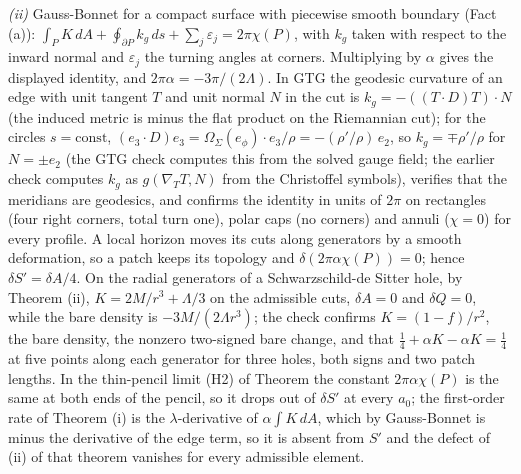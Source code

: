 \emph{(ii)} Gauss-Bonnet for a compact surface with piecewise smooth boundary (Fact (a)): $\int_{P}K\,dA + \oint_{\partial P}k_{g}\,ds + \sum_{j}\varepsilon_{j} = 2\pi\chi(P)$, with $k_{g}$ taken with respect to the inward normal and $\varepsilon_{j}$ the turning angles at corners. Multiplying by $\alpha$ gives the displayed identity, and $2\pi\alpha = -3\pi/(2\Lambda)$. In GTG the geodesic curvature of an edge with unit tangent $T$ and unit normal $N$ in the cut is $k_{g} = -((T\cdot D)T)\cdot N$ (the induced metric is minus the flat product on the Riemannian cut); for the circles $s = \mathrm{const}$, $(e_{3}\cdot D)e_{3} = \Omega_{\Sigma}(e_{\phi})\cdot e_{3}/\rho = -(\rho'/\rho)\,e_{2}$, so $k_{g} = \mp\rho'/\rho$ for $N = \pm e_{2}$ (the GTG check computes this from the solved gauge field; the earlier check computes $k_{g}$ as $g(\nabla_{T}T, N)$ from the Christoffel symbols), verifies that the meridians are geodesics, and confirms the identity in units of $2\pi$ on rectangles (four right corners, total turn one), polar caps (no corners) and annuli ($\chi = 0$) for every profile. A local horizon moves its cuts along generators by a smooth deformation, so a patch keeps its topology and $\delta(2\pi\alpha\chi(P)) = 0$; hence $\delta S' = \delta A/4$. On the radial generators of a Schwarzschild-de Sitter hole, by Theorem (ii), $K = 2M/r^{3} + \Lambda/3$ on the admissible cuts, $\delta A = 0$ and $\delta Q = 0$, while the bare density is $-3M/(2\Lambda r^{3})$; the check confirms $K = (1 - f)/r^{2}$, the bare density, the nonzero two-signed bare change, and that $\tfrac14 + \alpha K - \alpha K = \tfrac14$ at five points along each generator for three holes, both signs and two patch lengths. In the thin-pencil limit (H2) of Theorem  the constant $2\pi\alpha\chi(P)$ is the same at both ends of the pencil, so it drops out of $\delta S'$ at every $a_{0}$; the first-order rate of Theorem (i) is the $\lambda$-derivative of $\alpha\int K\,dA$, which by Gauss-Bonnet is minus the derivative of the edge term, so it is absent from $S'$ and the defect of (ii) of that theorem vanishes for every admissible element.

